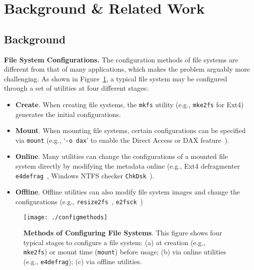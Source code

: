 \section{Background \& Related Work}
\label{sec:background}

\subsection{Background}

\noindent
\textbf{File System Configurations.}   
The configuration methods of file systems are different from that of many applications, {which makes the problem arguably more challenging}. As shown in Figure~\ref{fig:usage}, a typical file system may be configured through a set of utilities at four different stages:
    \vspace{-0.05in}
\begin{itemize}
    \item \textbf{Create}. When creating file systems,  the \texttt{mkfs} utility (e.g., \texttt{mke2fs} for Ext4) generates the initial configurations.
    \item \textbf{Mount}. When mounting file systems, certain configurations can be specified via \texttt{mount} (e.g., `\texttt{-o dax}' to enable the Direct Access or DAX feature~\cite{Ext4_DAX}). 
     \item \textbf{Online}. Many  utilities can change the  configurations of a mounted file system directly by modifying the metadata online (e.g., Ext4 defragmenter \texttt{e4defrag}~\cite{e4defrag},  Windows NTFS checker   \texttt{ChkDsk}~\cite{chkdsk}).       
     \item \textbf{Offline}. Offline utilities can also modify file system images and change  the configurations   (e.g.,   \texttt{resize2fs}~\cite{resize2fs},   \texttt{e2fsck}~\cite{e2fsck})
     
\end{itemize}


 
\begin{figure}[tb]
	\centering
    \texttt{[image: ./configmethods]}
   \vspace{-0.1in}
	\caption{  {\bf Methods of Configuring File Systems}. {This figure shows 
	four typical stages to configure a file system: (a) at creation (e.g., \texttt{mke2fs}) or mount time (\texttt{mount}) before usage; (b) via  online utilities (e.g., \texttt{e4defrag}); (c) via offline utilities. }} 
	\label{fig:usage}
\end{figure}


